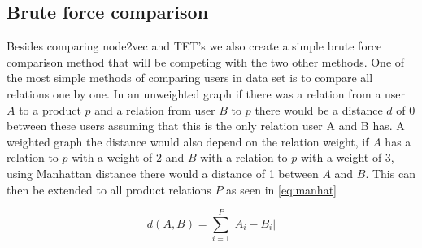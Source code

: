 \subsection{Brute force comparison}\label{Subsec:brute_force}
Besides comparing node2vec and TET's we also create a simple brute force comparison method that will be competing with the two other methods.
One of the most simple methods of comparing users in data set is to compare all relations one by one. 
In an unweighted graph if there was a relation from a user $A$ to a product $p$ and a relation from user $B$ to $p$ there would be a distance $d$ of 0 between these users assuming that this is the only relation user A and B has. 
A weighted graph the distance would also depend on the relation weight, if $A$ has a relation to $p$ with a weight of 2 and $B$ with a relation to $p$ with a weight of 3, using Manhattan distance there would a distance of 1 between $A$ and $B$. 
This can then be extended to all product relations $P$ as seen in \autoref{eq:manhat}

\begin{equation}\label{eq:manhat}
	d(A,B) = \sum_{i=1}^{P} |A_i - B_i|
\end{equation}
